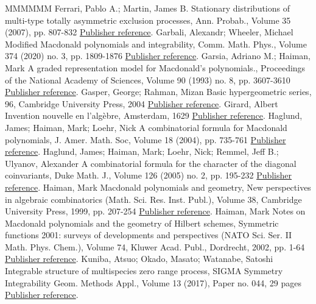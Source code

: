\documentclass[11pt]{article}
\theoremstyle{definition}
\numberwithin{equation}{section}
\begin{document}
\begin{thebibliography}{MMMMMM}
 Ferrari, Pablo A.; Martin, James B. Stationary distributions of multi-type totally asymmetric exclusion processes, Ann. Probab., Volume 35 (2007), pp. 807-832 \href{https://alco.centre-mersenne.org/articles/10.5802/alco.248/#FM07}{Publisher reference}.
 Garbali, Alexandr; Wheeler, Michael Modified Macdonald polynomials and integrability, Comm. Math. Phys., Volume 374 (2020) no. 3, pp. 1809-1876 \href{https://alco.centre-mersenne.org/articles/10.5802/alco.248/#garbali-wheeler-2020}{Publisher reference}.
 Garsia, Adriano M.; Haiman, Mark A graded representation model for Macdonald’s polynomials., Proceedings of the National Academy of Sciences, Volume 90 (1993) no. 8, pp. 3607-3610 \href{https://alco.centre-mersenne.org/articles/10.5802/alco.248/#garsia-haiman-1993}{Publisher reference}.
 Gasper, George; Rahman, Mizan Basic hypergeometric series, 96, Cambridge University Press, 2004 \href{https://alco.centre-mersenne.org/articles/10.5802/alco.248/#gasper-rahman-2004}{Publisher reference}.
 Girard, Albert Invention nouvelle en l’algèbre, Amsterdam, 1629 \href{https://alco.centre-mersenne.org/articles/10.5802/alco.248/#girard-1884}{Publisher reference}.
 Haglund, James; Haiman, Mark; Loehr, Nick A combinatorial formula for Macdonald polynomials, J. Amer. Math. Soc, Volume 18 (2004), pp. 735-761 \href{https://alco.centre-mersenne.org/articles/10.5802/alco.248/#HHL05}{Publisher reference}.
 Haglund, James; Haiman, Mark; Loehr, Nick; Remmel, Jeff B.; Ulyanov, Alexander A combinatorial formula for the character of the diagonal coinvariants, Duke Math. J., Volume 126 (2005) no. 2, pp. 195-232 \href{https://alco.centre-mersenne.org/articles/10.5802/alco.248/#LLT2}{Publisher reference}.
 Haiman, Mark Macdonald polynomials and geometry, New perspectives in algebraic combinatorics (Math. Sci. Res. Inst. Publ.), Volume 38, Cambridge University Press, 1999, pp. 207-254 \href{https://alco.centre-mersenne.org/articles/10.5802/alco.248/#Hai99}{Publisher reference}.
 Haiman, Mark Notes on Macdonald polynomials and the geometry of Hilbert schemes, Symmetric functions 2001: surveys of developments and perspectives (NATO Sci. Ser. II Math. Phys. Chem.), Volume 74, Kluwer Acad. Publ., Dordrecht, 2002, pp. 1-64 \href{https://alco.centre-mersenne.org/articles/10.5802/alco.248/#Haiman02}{Publisher reference}.
 Kuniba, Atsuo; Okado, Masato; Watanabe, Satoshi Integrable structure of multispecies zero range process, SIGMA Symmetry Integrability Geom. Methods Appl., Volume 13 (2017), Paper no. 044, 29 pages \href{https://alco.centre-mersenne.org/articles/10.5802/alco.248/#kuniba-okado-watanabe-2017}{Publisher reference}.

\end{thebibliography}
\end{document}
